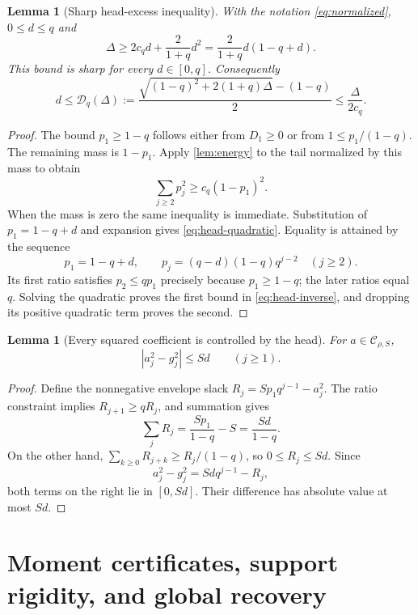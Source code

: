 \documentclass[11pt,a4paper]{article}
\numberwithin{equation}{section}
\newtheorem{lemma}[theorem]{Lemma}
\theoremstyle{definition}
\theoremstyle{remark}
\newcommand{\C}{\mathcal C}
\begin{document}
\begin{lemma}[Sharp head-excess inequality]
\label{lem:head}
With the notation \eqref{eq:normalized}, $0\le d\le q$ and
\begin{equation}
 \Delta\ge 2c_qd+\frac{2}{1+q}d^2
          =\frac{2}{1+q}d(1-q+d).
 \label{eq:head-quadratic}
\end{equation}
This bound is sharp for every $d\in[0,q]$. Consequently
\begin{equation}
 d\le\mathcal D_q(\Delta):=
 \frac{\sqrt{(1-q)^2+2(1+q)\Delta}-(1-q)}{2}
 \le\frac{\Delta}{2c_q}.
 \label{eq:head-inverse}
\end{equation}
\end{lemma}
\begin{proof}
The bound $p_1\ge1-q$ follows either from $D_1\ge0$ or from
$1\le p_1/(1-q)$. The remaining mass is $1-p_1$. Apply
\cref{lem:energy} to the tail normalized by this mass to obtain
\[
 \sum_{j\ge2}p_j^2\ge c_q(1-p_1)^2.
\]
When the mass is zero the same inequality is immediate. Substitution of
$p_1=1-q+d$ and expansion gives \eqref{eq:head-quadratic}.
Equality is attained by the sequence
\[
 p_1=1-q+d,\qquad
 p_j=(q-d)(1-q)q^{j-2}\quad(j\ge2).
\]
Its first ratio satisfies $p_2\le qp_1$ precisely because $p_1\ge1-q$;
the later ratios equal $q$. Solving the quadratic proves the first bound in
\eqref{eq:head-inverse}, and dropping its positive quadratic term proves
the second.
\end{proof}

\begin{lemma}[Every squared coefficient is controlled by the head]
\label{lem:slack}
For $a\in\C_{\rho,S}$,
\begin{equation}
 |a_j^2-g_j^2|\le Sd\qquad(j\ge1).
 \label{eq:square-slack}
\end{equation}
\end{lemma}
\begin{proof}
Define the nonnegative envelope slack
$R_j=Sp_1q^{j-1}-a_j^2$. The ratio constraint implies
$R_{j+1}\ge qR_j$, and summation gives
\[
 \sum_jR_j=\frac{Sp_1}{1-q}-S=\frac{Sd}{1-q}.
\]
On the other hand, $\sum_{k\ge0}R_{j+k}\ge R_j/(1-q)$, so
$0\le R_j\le Sd$. Since
\[
 a_j^2-g_j^2=Sdq^{j-1}-R_j,
\]
both terms on the right lie in $[0,Sd]$. Their difference has absolute value
at most $Sd$.
\end{proof}

\section{Moment certificates, support rigidity, and global recovery}
\label{sec:recovery}
\end{document}
